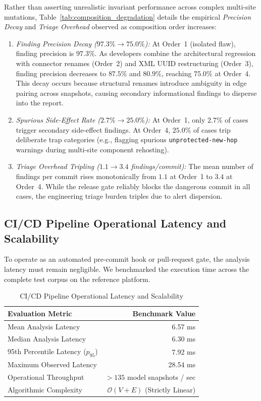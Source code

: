 \documentclass[journal]{IEEEtran}
\begin{document}
Rather than asserting unrealistic invariant performance across complex multi-site mutations, Table~\ref{tab:composition_degradation} details the empirical \emph{Precision Decay} and \emph{Triage Overhead} observed as composition order increases:
\begin{enumerate}
\item \emph{Finding Precision Decay ($97.3\% \to 75.0\%$):} At Order~1 (isolated flaw), finding precision is $97.3\%$. As developers combine the architectural regression with connector renames (Order~2) and XML UUID restructuring (Order~3), finding precision decreases to $87.5\%$ and $80.9\%$, reaching $75.0\%$ at Order~4. This decay occurs because structural renames introduce ambiguity in edge pairing across snapshots, causing secondary informational findings to disperse into the report.

\item \emph{Spurious Side-Effect Rate ($2.7\% \to 25.0\%$):} At Order~1, only $2.7\%$ of cases trigger secondary side-effect findings. At Order~4, $25.0\%$ of cases trip deliberate trap categories (e.g., flagging spurious \texttt{unprotected-new-hop} warnings during multi-site component rehosting).

\item \emph{Triage Overhead Tripling ($1.1 \to 3.4$ findings/commit):} The mean number of findings per commit rises monotonically from $1.1$ at Order~1 to $3.4$ at Order~4. While the release gate reliably blocks the dangerous commit in all cases, the engineering triage burden triples due to alert dispersion.
\end{enumerate}

\subsection{CI/CD Pipeline Operational Latency and Scalability}
\label{subsec:performance_latency}

To operate as an automated pre-commit hook or pull-request gate, the analysis latency must remain negligible. We benchmarked the execution time across the complete test corpus on the reference platform.

\begin{table}[htbp]
\centering
\caption{CI/CD Pipeline Operational Latency and Scalability}
\label{tab:performance_latency}
\renewcommand{\arraystretch}{1.15}
\begin{tabular}{l r}
\toprule
\textbf{Evaluation Metric} & \textbf{Benchmark Value} \\
\midrule
Mean Analysis Latency & 6.57 ms \\
Median Analysis Latency & 6.30 ms \\
95th Percentile Latency ($p_{95}$) & 7.92 ms \\
Maximum Observed Latency & 28.54 ms \\
Operational Throughput & $>135$ model snapshots / sec \\
Algorithmic Complexity & $\mathcal{O}(V + E)$ (Strictly Linear) \\
\bottomrule
\end{tabular}
\end{table}
\end{document}
